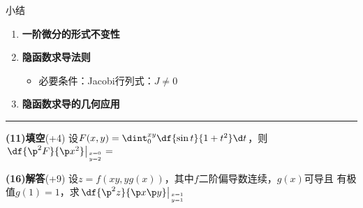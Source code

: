 \begin{frame}[<+->]{小结}
	\linespread{1.5}
	\begin{enumerate}
	  \item {\bf 一阶微分的形式不变性}
	  \item {\bf 隐函数求导法则}
	  \begin{itemize}
	    \item 必要条件：Jacobi行列式：$J\ne 0$
	  \end{itemize}
	  \item {\bf 隐函数求导的几何应用}
	\end{enumerate}
	
	\pause\pause\bigskip\hrule\bigskip
	\centerline{}
\end{frame}

\begin{frame}
	\linespread{1.2}
	\begin{exampleblock}{{\bf (11)\;填空}\hfill (+4)}
		设$F(x,y)=\dint_0^{xy}\df{\sin t}{1+t^2}\d t$，则
		$\left.\df{\p^2F}{\p x^2}\right|_{x=0 \atop y=2}=$
		\underline{\quad\quad\quad}
	\end{exampleblock}
	\bigskip
	\begin{exampleblock}{{\bf (16)\;解答}\hfill (+9)}
		设$z=f(xy,yg(x))$，其中$f$二阶偏导数连续，$g(x)$可导且
		有极值$g(1)=1$，求$\left.\df{\p^2z}{\p x\p y}\right|_{x=1\atop y=1}$
	\end{exampleblock}
\end{frame}

 
